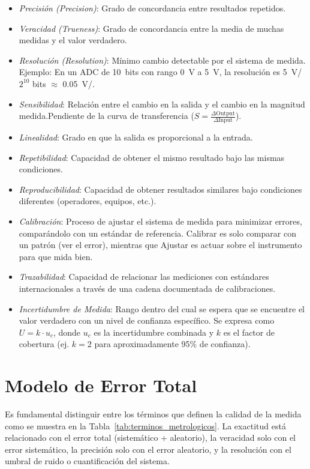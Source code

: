 \begin{itemize}
  \item \emph{Precisión (Precision)}: Grado de concordancia entre resultados repetidos. 
  \item \emph{Veracidad (Trueness)}: Grado de concordancia entre la media de muchas medidas y el valor verdadero. 
  \item \emph{Resolución (Resolution)}: Mínimo cambio detectable por el sistema de medida. Ejemplo: En un ADC de \SI{10}{bits} con rango \SI{0}{V} a \SI{5}{V}, la resolución es \SI{5}{V}/$2^{10}$ bits  \(\approx\) \SI{0.05}{V/\bit}.
  \item \emph{Sensibilidad}: Relación entre el cambio en la salida y el cambio en la magnitud medida.Pendiente de la curva de transferencia ($S = \frac{\Delta \text{Output}}{\Delta \text{Input}}$).
  \item \emph{Linealidad}: Grado en que la salida es proporcional a la entrada.
  \item \emph{Repetibilidad}: Capacidad de obtener el mismo resultado bajo las mismas condiciones.
  \item \emph{Reproducibilidad}: Capacidad de obtener resultados similares bajo condiciones diferentes (operadores, equipos, etc.).
  \item \emph{Calibración}: Proceso de ajustar el sistema de medida para minimizar errores, comparándolo con un estándar de referencia. Calibrar es solo comparar con un patrón (ver el error), mientras que Ajustar es actuar sobre el instrumento para que mida bien.
  \item \emph{Trazabilidad}: Capacidad de relacionar las mediciones con estándares internacionales a través de una cadena documentada de calibraciones.
  \item \emph{Incertidumbre de Medida}: Rango dentro del cual se espera que se encuentre el valor verdadero con un nivel de confianza específico. Se expresa como $U = k \cdot u_c$, donde $u_c$ es la incertidumbre combinada y $k$ es el factor de cobertura (ej. $k=2$ para aproximadamente 95\% de confianza).
\end{itemize}

\section{Modelo de Error Total}\label{sec:modelo_error}

Es fundamental distinguir entre los términos que definen la calidad de la medida como se muestra en la Tabla~\ref{tab:terminos_metrologicos}. La exactitud está relacionado con el error total (sistemático + aleatorio), la veracidad solo con el error sistemático, la precisión solo con el error aleatorio, y la resolución con el umbral de ruido o cuantificación del sistema. 

